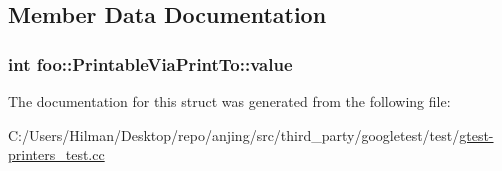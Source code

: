 \subsection{Member Data Documentation}
\hypertarget{structfoo_1_1_printable_via_print_to_a16f8c6420275d86f0d0112ca5a41bca2}{}
\subsubsection[{value}]{\setlength{\rightskip}{0pt plus 5cm}int foo\+::\+Printable\+Via\+Print\+To\+::value}\label{structfoo_1_1_printable_via_print_to_a16f8c6420275d86f0d0112ca5a41bca2}


The documentation for this struct was generated from the following file\+:\begin{DoxyCompactItemize}
\item 
C\+:/\+Users/\+Hilman/\+Desktop/repo/anjing/src/third\+\_\+party/googletest/test/\hyperlink{gtest-printers__test_8cc}{gtest-\/printers\+\_\+test.\+cc}\end{DoxyCompactItemize}
